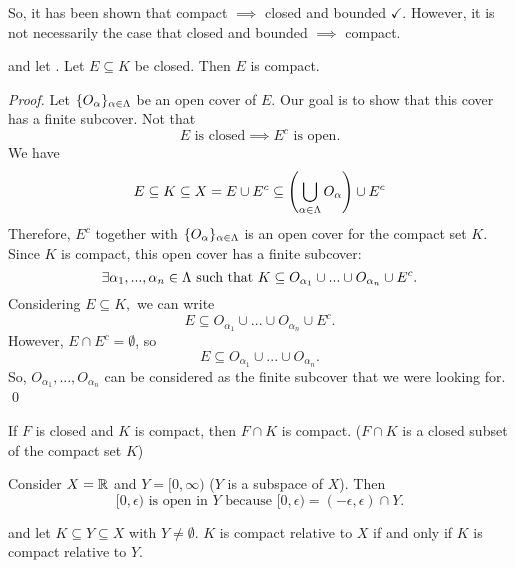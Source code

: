 	\begin{note}
			So, it has been shown that compact $\implies$ closed and bounded $\checkmark$. However, it is not necessarily the case that closed and bounded $\implies$ compact.
	\end{note}
	
	\begin{theorem}
		\routineMS and let \routineCompact. Let $E\subseteq K$ be closed. Then $E$ is compact.
	\end{theorem}
	
	\begin{proof}
		Let $\{O_\alpha \}_{\alpha \in \Lambda}$ be an open cover of $E$. Our goal is to show that this cover has a finite subcover. Not that $$E \text{ is closed} \implies E^c \text{ is open}.$$
		We have $$E \subseteq K \subseteq X = E\cup E^c \subseteq \left(\bigcup \limits_{\alpha \in \Lambda} O _\alpha\right) \cup E^c$$
		Therefore, $E^c$ together with $\{O_\alpha \}_{\alpha \in \Lambda}$ is an open cover for the compact set $K$. Since $K$ is compact, this open cover has a finite subcover:
		$$\exists \alpha_1,...,\alpha_n \in \Lambda \text{ such that } K\subseteq O_{\alpha_1} \cup ... \cup O_{\alpha_n} \cup E^c.$$
		Considering $E\subseteq K,$ we can write
		$$E \subseteq O_{\alpha_1}\cup ... \cup O_{\alpha_n} \cup E^c.$$
		However, $E\cap E^c = \emptyset$, so
		$$E \subseteq O_{\alpha_1} \cup... \cup O_{\alpha_n}.$$
		So, $O_{\alpha_1} ,... , O_{\alpha_n}$ can be considered as the finite subcover that we were looking for. \qed
	\end{proof}
	
	\begin{corollary}
		If $F$ is closed and $K$ is compact, then $F\cap K$ is compact. ($F\cap K$ is a closed subset of the compact set $K$)
	\end{corollary}
	
	Consider $X=\mathbb{R}$ and $Y=[0, \infty)$ ($Y$ is a subspace of $X$). Then
	$$[0, \epsilon) \text{ is open in } Y \text{ because } [0,\epsilon) = (-\epsilon, \epsilon)\cap Y.$$
	
	\begin{theorem}
		\routineMS and let $K\subseteq Y \subseteq X$ with $Y \not = \emptyset$. $K$ is compact relative to $X$ if and only if $K$ is compact relative to $Y$.
	\end{theorem}
	
